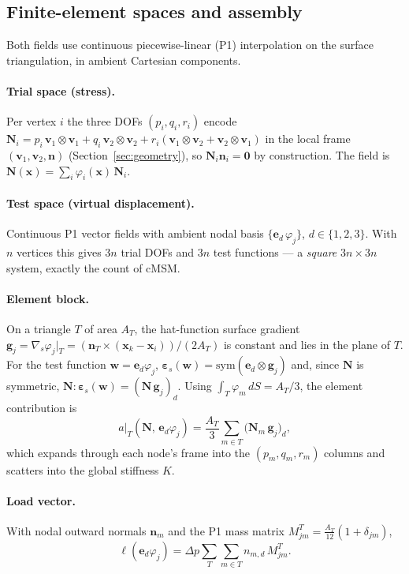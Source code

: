 \documentclass[11pt]{article}
\newcommand{\vv}[1]{\bm{#1}}          %
\newcommand{\nn}{\vv{n}}               %
\newcommand{\NN}{\vv{N}}               %
\newcommand{\tp}{\otimes}              %
\begin{document}
\subsection{Finite-element spaces and assembly}
\label{sec:fem-assembly}

Both fields use continuous piecewise-linear (P1) interpolation on the surface
triangulation, in ambient Cartesian components.

\paragraph{Trial space (stress).}  Per vertex $i$ the three DOFs $(p_i,q_i,r_i)$
encode $\NN_i = p_i\,\vv v_1\tp\vv v_1 + q_i\,\vv v_2\tp\vv v_2
+ r_i(\vv v_1\tp\vv v_2+\vv v_2\tp\vv v_1)$ in the local frame
$(\vv v_1,\vv v_2,\nn)$ (Section~\ref{sec:geometry}), so $\NN_i\nn_i=\vv0$ by
construction.  The field is $\NN(\vv x)=\sum_i\varphi_i(\vv x)\,\NN_i$.

\paragraph{Test space (virtual displacement).}  Continuous P1 vector fields with
ambient nodal basis $\{\vv e_d\,\varphi_j\}$, $d\in\{1,2,3\}$.  With $n$ vertices
this gives $3n$ trial DOFs and $3n$ test functions --- a \emph{square}
$3n\times3n$ system, exactly the count of cMSM.

\paragraph{Element block.}  On a triangle $T$ of area $A_T$, the hat-function
surface gradient $\vv g_j=\nabla_{\!s}\varphi_j|_T = (\nn_T\times(\vv x_k-\vv
x_i))/(2A_T)$ is constant and lies in the plane of $T$.  For the test function
$\vv w=\vv e_d\varphi_j$, $\bm\varepsilon_s(\vv w)=\mathrm{sym}(\vv e_d\tp\vv
g_j)$ and, since $\NN$ is symmetric, $\NN:\bm\varepsilon_s(\vv w)=(\NN\,\vv
g_j)_d$.  Using $\int_T\varphi_m\,dS=A_T/3$, the element contribution is
\begin{equation}
  a\big|_T(\NN,\,\vv e_d\varphi_j)
  = \frac{A_T}{3}\sum_{m\in T}\bigl(\NN_m\,\vv g_j\bigr)_d,
  \label{eq:fem-block}
\end{equation}
which expands through each node's frame into the $(p_m,q_m,r_m)$ columns and
scatters into the global stiffness $K$.

\paragraph{Load vector.}  With nodal outward normals $\nn_m$ and the P1 mass
matrix $M^T_{jm}=\tfrac{A_T}{12}(1+\delta_{jm})$,
\begin{equation}
  \ell(\vv e_d\varphi_j)=\Delta p\sum_T\sum_{m\in T} n_{m,d}\,M^T_{jm}.
  \label{eq:fem-load}
\end{equation}
\end{document}
